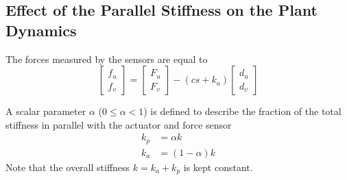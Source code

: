 \documentclass{ISMA_USD2020}
\begin{document}
\subsection{Effect of the Parallel Stiffness on the Plant Dynamics}
\label{sec:org47b3420}
The forces measured by the sensors are equal to
\begin{equation}
\label{eq:measured_force_kp}
  \begin{bmatrix} f_{u} \\ f_{v} \end{bmatrix} =
  \begin{bmatrix} F_u \\ F_v \end{bmatrix} - (c s + k_a)
  \begin{bmatrix} d_u \\ d_v \end{bmatrix}
\end{equation}

A scalar parameter \(\alpha\) (\(0 \le \alpha < 1\)) is defined to describe the fraction of the total stiffness in parallel with the actuator and force sensor
\begin{subequations}
  \begin{align}
    k_p &= \alpha k \\
    k_a &= (1 - \alpha) k
  \end{align}
\end{subequations}
Note that the overall stiffness \(k = k_a + k_p\) is kept constant.
\end{document}

